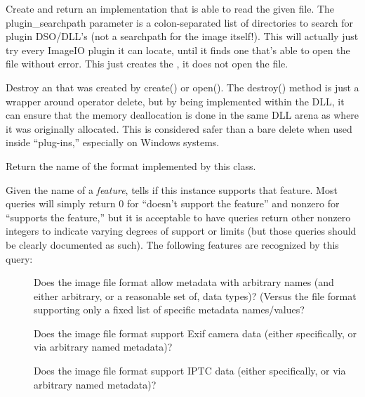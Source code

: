 
Create and return an \ImageInput implementation that is able
to read the given file.  The {\kw plugin_searchpath} parameter is a
colon-separated list of directories to search for \product plugin
DSO/DLL's (not a searchpath for the image itself!).  This will
actually just try every ImageIO plugin it can locate, until it
finds one that's able to open the file without error.  This just
creates the \ImageInput, it does not open the file.
\apiend

\NEW  %

Destroy an \ImageInput that was created by {\cf create()} or {\cf open()}.
The {\cf destroy()} method is just a wrapper around operator {\cf delete},
but by being implemented within the \product DLL, it can ensure that the
memory deallocation is done in the same DLL arena as where it was originally
allocated. This is considered safer than a bare {\cf delete} when
used inside ``plug-ins,'' especially on Windows systems.
\apiend

Return the name of the format implemented by this class.
\apiend

\label{sec:inputsupportsfeaturelist}
Given the name of a \emph{feature}, tells if this \ImageInput  instance
supports that feature. Most queries will simply return 0 for ``doesn't
support the feature'' and nonzero for ``supports the feature,'' but it is
acceptable to have queries return other nonzero integers to indicate varying
degrees of support or limits (but those queries should be clearly documented
as such). The following features are recognized by this query:
\begin{description}
\item[\spc] \spc
\item[\rm {}] Does the image file format allow
  metadata with arbitrary names (and either arbitrary, or a reasonable set
  of, data types)? (Versus the file format supporting only a fixed list of
  specific metadata names/values?
\item[\rm {}] Does the image file format support Exif camera data
  (either specifically, or via arbitrary named metadata)?
\item[\rm {}] Does the image file format support IPTC data
  (either specifically, or via arbitrary named metadata)?
  \end{description}
\apiend

